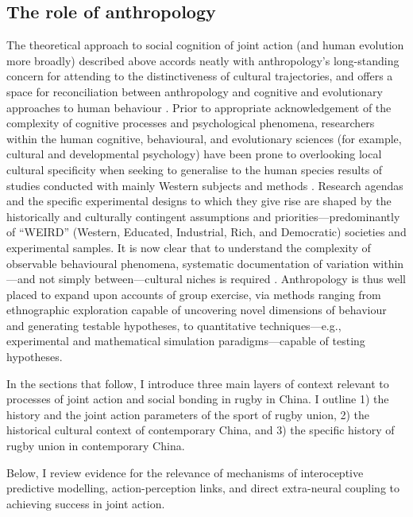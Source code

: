 \begin{CJK}{UTF8}{gbsn}
  \subsection{The role of anthropology}
  The theoretical approach to social cognition of joint action (and human evolution more broadly) described above accords neatly with anthropology's long-standing concern for attending to the distinctiveness of cultural trajectories, and offers a space for reconciliation between anthropology and cognitive and evolutionary approaches to human behaviour \citep{Whitehouse2012}.  Prior to appropriate acknowledgement of the complexity of cognitive processes and psychological phenomena, researchers within the human cognitive, behavioural, and evolutionary sciences (for example, cultural and developmental psychology) have been prone to overlooking local cultural specificity when seeking to generalise to the human species results of studies conducted with mainly Western subjects and methods \citep{Henrich2010d}.  Research agendas and the specific experimental designs to which they give rise are shaped by the historically and culturally contingent assumptions and priorities---predominantly of ``WEIRD'' (Western, Educated, Industrial, Rich, and Democratic) societies and experimental samples.  It is now clear that to understand the complexity of observable behavioural phenomena, systematic documentation of variation within---and not simply between---cultural niches is required \citep{Fuentes2016}.  Anthropology is thus well placed to expand upon accounts of group exercise, via methods ranging from ethnographic exploration capable of uncovering novel dimensions of behaviour and generating testable hypotheses, to quantitative techniques---e.g., experimental and mathematical simulation paradigms---capable of testing hypotheses.




  In the sections that follow, I introduce three main layers of context relevant to processes of joint action and social bonding in rugby in China.  I outline 1) the history and the joint action parameters of the sport of rugby union, 2) the historical cultural context of contemporary China, and 3) the specific history of rugby union in contemporary China.













  Below, I review evidence for the relevance of mechanisms of interoceptive predictive modelling, action-perception links, and direct extra-neural coupling to achieving success in joint action.


\end{CJK}
